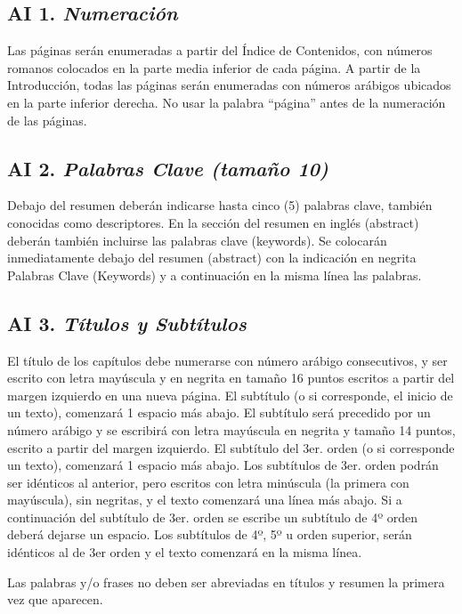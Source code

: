 \subsection*{AI 1. \textit{Numeración}}

Las páginas serán enumeradas a partir del Índice de Contenidos, con números romanos colocados en la parte media inferior de cada página. A partir de la Introducción, todas las páginas serán enumeradas con números arábigos ubicados en la parte inferior derecha. No usar la palabra “página” antes de la numeración de las páginas.

\subsection*{AI 2. \textit{Palabras Clave (tamaño 10)}}

Debajo del resumen deberán indicarse hasta cinco (5) palabras clave, también conocidas como descriptores. En la sección del resumen en inglés (abstract) deberán también incluirse las palabras clave (keywords). Se colocarán inmediatamente debajo del resumen (abstract) con la indicación en negrita Palabras Clave (Keywords) y a continuación en la misma línea las palabras. 

\subsection*{AI 3. \textit{Títulos y Subtítulos}}

El título de los capítulos debe numerarse con número arábigo consecutivos, y ser escrito con letra mayúscula y en negrita en tamaño 16 puntos escritos a partir del margen izquierdo en una nueva página. El subtítulo (o si corresponde, el inicio de un texto), comenzará 1 espacio más abajo. El subtítulo será precedido por un número arábigo y se escribirá con letra mayúscula en negrita y tamaño 14 puntos, escrito a partir del margen izquierdo. El subtítulo del 3er. orden (o si corresponde un texto), comenzará 1 espacio más abajo. Los subtítulos de 3er. orden podrán ser idénticos al anterior, pero escritos con letra minúscula (la primera con mayúscula), sin negritas, y el texto comenzará una línea más abajo. Si a continuación del subtítulo de 3er. orden se escribe un subtítulo de 4º orden deberá dejarse un espacio. Los subtítulos de 4º, 5º u orden superior, serán idénticos al de 3er orden y el texto comenzará en la misma línea.

Las palabras y/o frases no deben ser abreviadas en títulos y resumen la primera vez que aparecen. 

